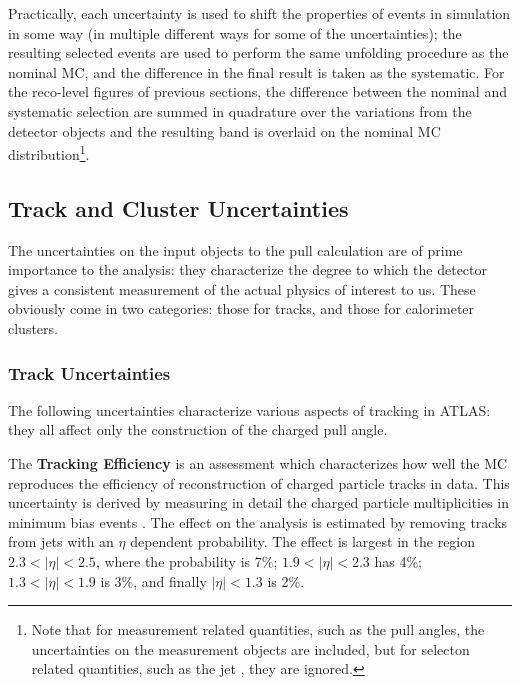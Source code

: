  Practically, each uncertainty is used to shift the properties of events in simulation in some way (in multiple different ways for some of the uncertainties); the resulting selected events are used to perform the same unfolding procedure as the nominal MC, and the difference in the final result is taken as the systematic. For the reco-level figures of previous sections, the difference between the nominal and systematic selection are summed in quadrature over the variations from the detector objects and the resulting band is overlaid on the nominal MC distribution\footnote{Note that for measurement related quantities, such as the pull angles, the uncertainties on the measurement objects are included, but for selecton related quantities, such as the jet \pt, they are ignored.}.

	\subsection{Track and Cluster Uncertainties}
	\label{chapter:color:uncertainties:inputs}

	The uncertainties on the input objects to the pull calculation are of prime importance to the analysis: they characterize the degree to which the detector gives a consistent measurement of the actual physics of interest to us. These obviously come in two categories: those for tracks, and those for calorimeter clusters. 

	\subsubsection{Track Uncertainties}

	The following uncertainties characterize various aspects of tracking in ATLAS: they all affect only the construction of the charged pull angle.

	The \textbf{Tracking Efficiency} is an assessment which characterizes how well the MC reproduces the efficiency of reconstruction of charged particle tracks in data. This uncertainty is derived by measuring in detail the charged particle multiplicities in minimum bias events . The effect on the analysis is estimated by removing tracks from jets with an $\eta$ dependent probability. The effect is largest in the region $2.3 < |\eta| < 2.5$, where the probability is $7\%$; $1.9 < |\eta| < 2.3$ has 4\%; $1.3 < |\eta| < 1.9$ is 3\%, and finally $|\eta| < 1.3$ is 2\%. 


